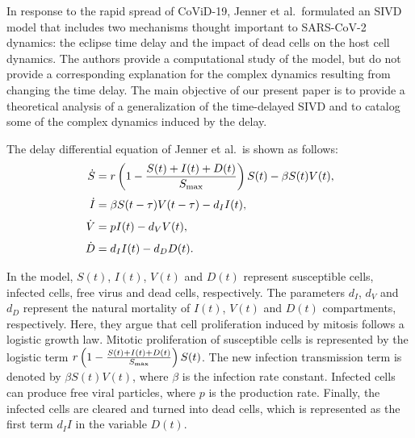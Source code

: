 \documentclass{CMHPhD-SIVD}
\begin{document}
In response to the rapid spread of CoViD-19, Jenner et al.\ formulated an SIVD model that includes two mechanisms thought important to SARS-CoV-2 dynamics: the eclipse time delay and the impact of dead cells on the host cell dynamics\cite{jenner2021covid}.
The authors provide a computational study of the model, but do not provide a corresponding explanation for the complex dynamics resulting from changing the time delay.   The main objective of our present paper is to provide a theoretical analysis of a generalization of the time-delayed SIVD and to catalog some of the complex dynamics induced by the delay.

The delay differential equation of Jenner et al.\ is shown as follows:
\begin{subequations}\label{SIVD-J}
   \begin{align}
		 \dot{S} &= r \left(1-\frac{S(t)+I(t)+D(t)}{S_{\text{max}}}\right)S(t)-\beta S(t)V(t),
		 \label{SIVD-SJ}\\[3pt]
		 \dot{I} &= \beta S(t-\tau)V(t-\tau)-d_I I(t),
		 \label{SIVD-IJ}\\[3pt]
         \dot{V} &= pI(t)-d_V V(t),
		 \label{SIVD-VJ}\\[3pt]
		 \dot{D} &= d_I I(t)-d_D D(t).
		 \label{SIVD-DJ}
   \end{align}
\end{subequations}

In the model, $S(t)$, $I(t)$, $V(t)$ and $D(t)$ represent susceptible cells, infected cells, free virus and dead cells, respectively. The parameters $d_I$, $d_V$ and $d_D$ represent the natural mortality of $I(t)$, $V(t)$ and $D(t)$ compartments, respectively. Here, they argue that cell proliferation induced by mitosis follows a logistic growth law. Mitotic proliferation of susceptible cells is represented by the logistic term $r \left(1-\frac{S(t)+I(t)+D(t)}{S_{\text{max}}}\right)S(t)$.  The new infection transmission term is denoted by $\beta S(t)V(t)$, where $\beta$ is the infection rate constant. Infected cells can produce free viral particles, where $p$ is the production rate. Finally, the infected cells are cleared and turned into dead cells, which is represented as the first term $d_I I$ in the variable $D(t)$.
\end{document}
